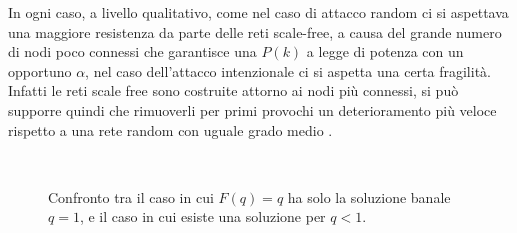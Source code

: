 In ogni caso, a livello qualitativo, come nel caso di attacco random ci si aspettava una maggiore resistenza da parte delle reti scale-free, a causa del grande numero di nodi poco connessi che garantisce una $P(k)$ a legge di potenza con un opportuno $\alpha$, nel caso dell'attacco intenzionale ci si aspetta una certa fragilit\`a. Infatti le reti scale free sono costruite attorno ai nodi pi\`u connessi, si pu\`o supporre quindi che rimuoverli per primi provochi un deterioramento pi\`u veloce rispetto a una rete random con uguale grado medio \parencite{Barbalbert2002}.
\begin{figure}[t!]
	\centering
	$\;$
	\caption[Esistenza soluzione non banale.]{Confronto tra il caso in cui $F(q)=q$ ha solo la soluzione banale $q=1$, e il caso in cui esiste una soluzione per $q<1$.}
	\label{fig:banalita}
\end{figure}
\clearpage